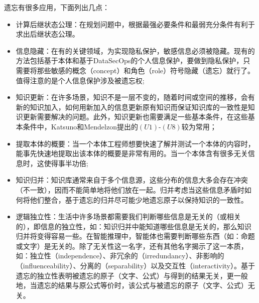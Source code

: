 遗忘有很多应用，下面列出几点：
\begin{itemize}
	\item 计算后继状态公理：在规划问题中，根据最强必要条件和最弱充分条件有利于求出后继状态公理\cite{DBLP:journals/jair/Lin03}。%
	\item 信息隐藏：在有的关键领域，为实现隐私保护，敏感信息必须被隐藏。现有的方法包括基于本体\cite{DBLP:journals/ai/KonevL0W13}和基于DataSecOps的个人信息保护\cite{wangwen2021}，要做到隐私保护，只需要将那些敏感的概念（concept）和角色（role）符号隐藏（遗忘）就行了。值得注意的是个人信息保护涉及被遗忘权\cite{zhujia2020};
	\item 知识更新：在许多场景，知识不是一层不变的，随着时间或空间的推移，会有新的知识加入，如何用新加入的信息更新原有知识而保证知识库的一致性是知识更新需要解决的问题。此外，知识更新也需要满足一些基本条件，在这些基本条件中，Katsuno和Mendelzon提出的$(U1)$-$(U8)$较为常用；%
	\item 提取本体的概要：当一个本体工程师想要快速了解并测试一个本体的内容时，能事先快速地提取出该本体的概要是非常有用的。当一个本体含有很多无关信息时，这使得事半功倍;
	\item 知识归并：知识库通常来自于多个信息源，这些分布的信息大多会存在冲突（不一致），因而不能简单地将他们放在一起。归并考虑当这些信息矛盾时如何将他们整合\cite{DBLP:journals/tkde/LiberatoreS98,DBLP:journals/logcom/KoniecznyP02,DBLP:journals/jair/Maynard-ZhangL03,konieczny2004da2,DBLP:journals/ai/EveraereKM10}，基于遗忘的归并尽可能少地遗忘原子以保持知识的一致性\cite{xudai2011}。
	\item 逻辑独立性：生活中许多场景都需要我们判断哪些信息是无关的（或相关的），即信息的独立性\cite{DBLP:journals/jphil/Sandu93,DBLP:journals/igpl/Sandu97,DBLP:journals/igpl/Vaananen02,DBLP:journals/synthese/Sevenster06}，如：知识归并中能知道哪些信息是无关的，那么知识归并将变得容易一些。在智能推理中，智能体也需要判断哪些东西（如：命题或文字）是无关的。除了无关性这一名字，还有其他名字揭示了这一本质\cite{bibid}，如：独立性（independence）、非冗余的（irredundancy）、非影响的（influenceability）、分离的（separability）以及交互性（interactivity）。基于遗忘的独立性表明被遗忘的原子（文字、公式）与得到的结果无关，更一般地，当遗忘的结果与原公式等价时，该公式与被遗忘的原子（文字、公式）无关\cite{xudai2011}。
\end{itemize}







